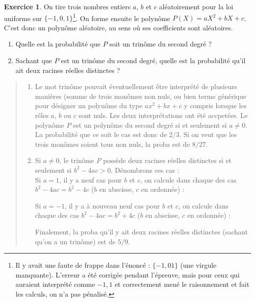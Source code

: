 \documentclass[10pt]{article}
\theoremstyle{definition}
\newtheorem{exo}{Exercice}
\newenvironment{solution}{\begin{quote}\color{teal}}{\end{quote}}
\begin{document}
\begin{exo}
On tire trois nombres entiers $a$, $b$ et $c$ aléatoirement pour la loi uniforme sur $\{-1,0,1\}$\footnote{Il y avait une faute de frappe dans l'énoncé : $\{-1,01\}$ (une virgule manquante). L'erreur a été corrigée pendant l'épreuve, mais pour ceux qui auraient interprété comme ${-1,1}$ et correctement mené le raisonnement et fait les calculs, on n'a pas pénalisé.}. On forme ensuite le polynôme $P(X)=aX^2+bX+c$. C'est donc un \og polynôme aléatoire\fg, au sens où ses coefficients sont aléatoires.
\begin{enumerate}
\item Quelle est la probabilité que $P$ soit un trinôme du second degré ?
\item Sachant que $P$ est un trinôme du second degré, quelle est la probabilité qu'il ait deux racines réelles distinctes ?
\end{enumerate}

\begin{solution}
\begin{enumerate}
\item Le mot \og trinôme\fg{} pouvait éventuellement être interprété de plusieurs manières (somme de trois monômes non nuls, ou bien terme générique pour désigner un polynôme du type $ax^2+bx+c$ y compris lorsque les réles $a$, $b$ ou $c$ sont nuls. Les deux interprétations ont été accpetées. Le polynôme $P$ est un polynôme du second degré si et seulement si $a\neq 0$. La probabilité que ce soit le cas est donc de $2/3$.  Si on veut que les trois monômes soient tous non nuls, la proba est de $8/27$.
\item Si $a\neq 0$, le trinôme $P$ possède deux racines réelles distinctes si et seulement si $b^2-4ac> 0$. Dénombrons ces cas :\\
Si $a=1$, il y a neuf cas pour $b$ et $c$, on calcule dans chaque des cas $b^2-4ac=b^2-4c$ ($b$ en abscisse, $c$ en ordonnée) :
\begin{center}
\end{center}
Si $a=-1$, il y a à nouveau neuf cas pour $b$ et $c$, on calcule dans chaque des cas $b^2-4ac=b^2+4c$ ($b$ en abscisse, $c$ en ordonnée) :
\begin{center}
\end{center}
Finalement, la proba qu'il y ait deux racines réelles distinctes (sachant qu'on a un trinôme) est de $5/9$.
\end{enumerate}
\end{solution}

\end{exo}
\end{document}
